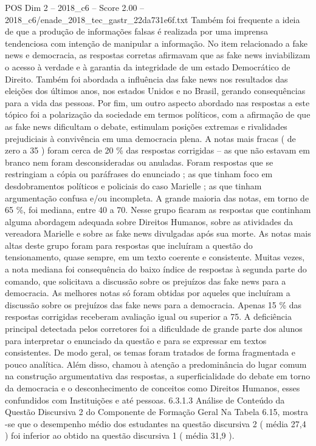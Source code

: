 \begin{textsample}{POS Dim 2 – 2018\_c6 – Score 2.00 – 2018\_c6/enade\_2018\_tec\_gastr\_22da731e6f.txt}
Também foi frequente a ideia de que a produção de informações falsas é realizada por uma imprensa tendenciosa com intenção de manipular a informação.
No item relacionado a fake news e democracia, as respostas corretas afirmavam que as fake news inviabilizam o acesso à verdade e à garantia da integridade de um estado Democrático de Direito.
Também foi abordada a influência das fake news nos resultados das eleições dos últimos anos, nos estados Unidos e no Brasil, gerando consequências para a vida das pessoas.
Por fim, um outro aspecto abordado nas respostas a este tópico foi a polarização da sociedade em termos políticos, com a afirmação de que as fake news dificultam o debate, estimulam posições extremas e rivalidades prejudiciais à convivência em uma democracia plena.
A notas mais fracas ( de zero a 35 ) foram cerca de 20 \% das respostas corrigidas – as que não estavam em branco nem foram desconsideradas ou anuladas.
Foram respostas que se restringiam a cópia ou paráfrases do enunciado ; as que tinham foco em desdobramentos políticos e policiais do caso Marielle ; as que tinham argumentação confusa e/ou incompleta.
A grande maioria das notas, em torno de 65 \%, foi mediana, entre 40 a 70.
Nesse grupo ficaram as respostas que continham alguma abordagem adequada sobre Direitos Humanos, sobre as atividades da vereadora Marielle e sobre as fake news divulgadas após sua morte.
As notas mais altas deste grupo foram para respostas que incluíram a questão do tensionamento, quase sempre, em um texto coerente e consistente.
Muitas vezes, a nota mediana foi consequência do baixo índice de respostas à segunda parte do comando, que solicitava a discussão sobre os prejuízos das fake news para a democracia.
As melhores notas só foram obtidas por aqueles que incluíram a discussão sobre os prejuízos das fake news para a democracia.
Apenas 15 \% das respostas corrigidas receberam avaliação igual ou superior a 75.
A deficiência principal detectada pelos corretores foi a dificuldade de grande parte dos alunos para interpretar o enunciado da questão e para se expressar em textos consistentes.
De modo geral, os temas foram tratados de forma fragmentada e pouco analítica.
Além disso, chamou à atenção a predominância do lugar comum na construção argumentativa das respostas, a superficialidade do debate em torno da democracia e o desconhecimento de conceitos como Direitos Humanos, esses confundidos com Instituições e até pessoas. 6.3.1.3 Análise de Conteúdo da Questão Discursiva 2 do Componente de Formação Geral Na Tabela 6.15, mostra -se que o desempenho médio dos estudantes na questão discursiva 2 ( média 27,4 ) foi inferior ao obtido na questão discursiva 1 ( média 31,9 ).

\end{textsample}
